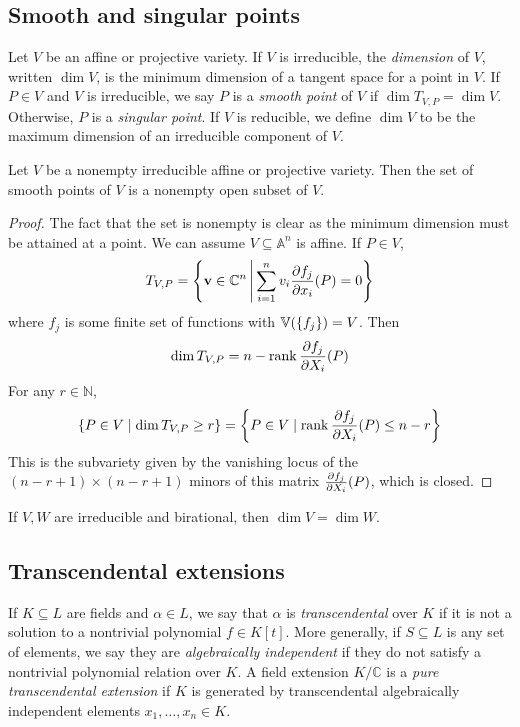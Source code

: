 \subsection{Smooth and singular points}
\begin{definition}
    Let \( V \) be an affine or projective variety.
    If \( V \) is irreducible, the \emph{dimension} of \( V \), written \( \dim V \), is the minimum dimension of a tangent space for a point in \( V \).
    If \( P \in V \) and \( V \) is irreducible, we say \( P \) is a \emph{smooth point} of \( V \) if \( \dim T_{V,P} = \dim V \).
    Otherwise, \( P \) is a \emph{singular point}.
    If \( V \) is reducible, we define \( \dim V \) to be the maximum dimension of an irreducible component of \( V \).
\end{definition}
\begin{theorem}
    Let \( V \) be a nonempty irreducible affine or projective variety.
    Then the set of smooth points of \( V \) is a nonempty open subset of \( V \).
\end{theorem}
\begin{proof}
    The fact that the set is nonempty is clear as the minimum dimension must be attained at a point.
    We can assume \( V \subseteq \mathbb A^n \) is affine.
    If \( P \in V \),
    \[ T_{V,P} = \qty{\vb v \in \mathbb C^n \,\middle|\,\sum_{i=1}^n v_i \pdv{f_j}{x_i}\qty(P) = 0} \]
    where \( f_j \) is some finite set of functions with \( \mathbb V(\qty{f_j}) = V \).
    Then
    \[ \dim T_{V,P} = n - \rank \pdv{f_j}{X_i}\qty(P) \]
    For any \( r \in \mathbb N \),
    \[ \qty{P \in V \mid \dim T_{V,P} \geq r} = \qty{P \in V \mid \rank \pdv{f_j}{X_i}\qty(P) \leq n - r} \]
    This is the subvariety given by the vanishing locus of the \( (n-r+1) \times (n-r+1) \) minors of this matrix \( \pdv{f_j}{X_i}\qty(P) \), which is closed.
\end{proof}
\begin{corollary}
    If \( V, W \) are irreducible and birational, then \( \dim V = \dim W \).
\end{corollary}

\subsection{Transcendental extensions}
If \( K \subseteq L \) are fields and \( \alpha \in L \), we say that \( \alpha \) is \emph{transcendental} over \( K \) if it is not a solution to a nontrivial polynomial \( f \in K[t] \).
More generally, if \( S \subseteq L \) is any set of elements, we say they are \emph{algebraically independent} if they do not satisfy a nontrivial polynomial relation over \( K \).
A field extension \( K / \mathbb C \) is a \emph{pure transcendental extension} if \( K \) is generated by transcendental algebraically independent elements \( x_1, \dots, x_n \in K \).

